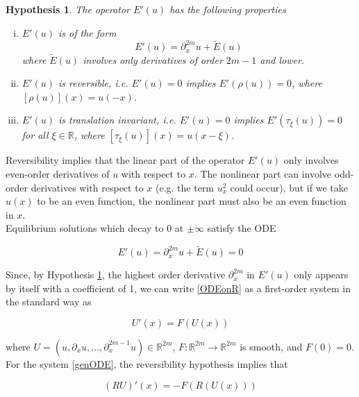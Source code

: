 \documentclass[12pt]{article}
\def\R{{\mathbb R}}
\newtheorem{hypothesis}{Hypothesis}
\begin{document}
\begin{hypothesis}\label{Eprimehyp}
The operator $E'(u)$ has the following properties
\begin{enumerate}[(i)]
\item $E'(u)$ is of the form
\begin{equation}\label{Eprimeuform}
E'(u) = \partial_x^{2m}u + \tilde{E}(u)
\end{equation}
where $\tilde{E}(u)$ involves only derivatives of order $2m-1$ and lower.
\item $E'(u)$ is reversible, i.e. $E'(u) = 0$ implies $E'(\rho(u)) = 0$,
where $[\rho(u)](x) = u(-x)$.
\item $E'(u)$ is translation invariant, i.e. $E'(u) = 0$ implies $E'(\tau_\xi(u)) = 0$ for all $\xi \in \R$, where $[\tau_\xi(u)](x) = u(x - \xi)$.
\end{enumerate}
\end{hypothesis}

Reversibility implies that the linear part of the operator $E'(u)$ only involves even-order derivatives of $u$ with respect to $x$. The nonlinear part can involve odd-order derivatives with respect to $x$ (e.g. the term $u_x^2$ could occur), but if we take $u(x)$ to be an even function, the nonlinear part must also be an even function in $x$.\\

Equilibrium solutions which decay to 0 at $\pm \infty$ satisfy the ODE 

\begin{equation}\label{ODEonR}
E'(u) = \partial_x^{2m}u + \tilde{E}(u) = 0
\end{equation}

Since, by Hypothesis \ref{Eprimehyp}, the highest order derivative $\partial_x^{2m}$ in $E'(u)$ only appears by itself with a coefficient of 1, we can write \eqref{ODEonR} as a first-order system in the standard way as

\begin{equation}\label{genODE}
U'(x) = F(U(x))
\end{equation}

where $U = (u, \partial_x u, \dots, \partial_x^{2m-1} u) \in \R^{2m}$, $F: \R^{2m} \rightarrow \R^{2m}$ is smooth, and $F(0) = 0$. For the system \eqref{genODE}, the reversibility hypothesis implies that

\begin{equation}\label{genODErev}
(RU)'(x) = -F(R(U(x)))
\end{equation}
\end{document}
